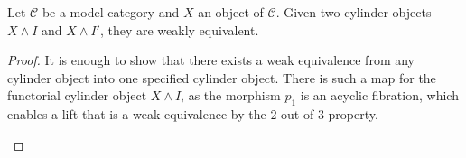 \documentclass[../thesis.tex]{subfiles}
\begin{document}
            \begin{proposition}
                Let $\mathcal{C}$ be a model category and $X$ an object of $\mathcal{C}$. Given two cylinder objects $X\wedge I$ and $X\wedge I'$, they are weakly equivalent. 
            \end{proposition}

            \begin{proof}
                It is enough to show that there exists a weak equivalence from any cylinder object into one specified cylinder object. There is such a map for the functorial cylinder object $X\wedge I$, as the morphism $p_1$ is an acyclic fibration, which enables a lift that is a weak equivalence by the $2$-out-of-$3$ property.

                \begin{center}
                \end{center}
            \end{proof}
\end{document}
